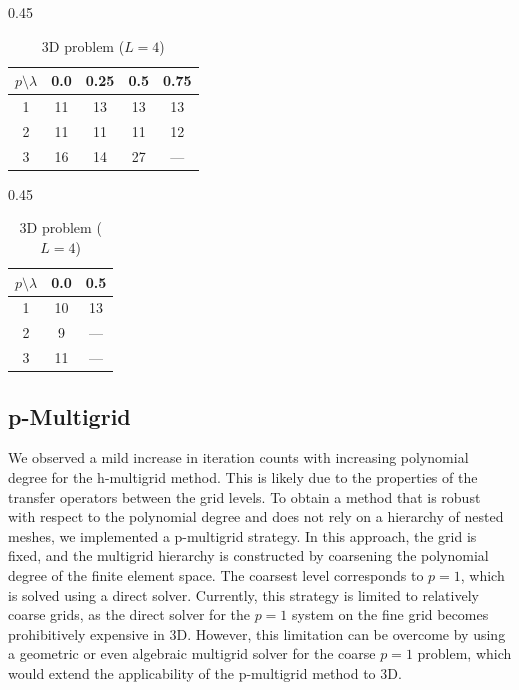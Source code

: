 \documentclass{elsarticle}
\begin{document}
\begin{table}[htbp]
    \centering
    \caption{Iteration counts for varying cell threshold $\lambda$ with fixed shyness threshold $\xi=3$ and smoothing steps $s=3$. Left: 2D problem ($L=8$). Right: 3D problem ($L=4$).}
    \label{tab:iter_lambda}

    \begin{subtable}{0.45\textwidth}
        \centering
        \caption{2D problem ($L=8$)}
        \label{tab:iter_2d_lambda}
        \begin{tabular}{c|cccc}
            \toprule
            $p \setminus \lambda$ & 0.0 & 0.25 & 0.5 & 0.75 \\
            \midrule
            1                     & 11  & 13   & 13  & 13   \\
            2                     & 11  & 11   & 11  & 12   \\
            3                     & 16  & 14   & 27  & ---  \\
            \bottomrule
        \end{tabular}
    \end{subtable}
    \begin{subtable}{0.45\textwidth}
        \centering
        \caption{3D problem ($L=4$)}
        \label{tab:iter_3d_lambda}
        \begin{tabular}{c|cc}
            \toprule
            $p \setminus \lambda$ & 0.0 & 0.5 \\
            \midrule
            1                     & 10  & 13  \\
            2                     & 9   & --- \\
            3                     & 11  & --- \\
            \bottomrule
        \end{tabular}
    \end{subtable}
\end{table}

\subsection{p-Multigrid}

We observed a mild increase in iteration counts with increasing polynomial degree for the h-multigrid method. This is
likely due to the properties of the transfer operators between the grid levels. To obtain a method that is robust with
respect to the polynomial degree and does not rely on a hierarchy of nested meshes, we implemented a p-multigrid
strategy. In this approach, the grid is fixed, and the multigrid hierarchy is constructed by coarsening the polynomial
degree of the finite element space. The coarsest level corresponds to $p=1$, which is solved using a direct solver.
Currently, this strategy is limited to relatively coarse grids, as the direct solver for the $p=1$ system on the fine
grid becomes prohibitively expensive in 3D. However, this limitation can be overcome by using a geometric or even
algebraic multigrid solver for the coarse $p=1$ problem, which would extend the applicability of the p-multigrid method
to 3D.
\end{document}
